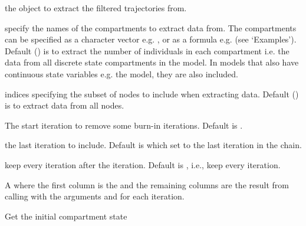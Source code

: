 \documentclass[letterpaper]{book}
\begin{document}
%
\begin{Arguments}
\begin{ldescription}
\item[\code{model}] the  object to extract the
filtered trajectories from.

\item[\code{compartments}] specify the names of the compartments to
extract data from. The compartments can be specified as a
character vector e.g. ,
or as a formula e.g.  (see
`Examples'). Default () is to
extract the number of individuals in each compartment i.e. the
data from all discrete state compartments in the model. In
models that also have continuous state variables e.g. the
 model, they are also included.

\item[\code{index}] indices specifying the subset of nodes to include
when extracting data. Default () is to
extract data from all nodes.

\item[\code{start}] The start iteration to remove some burn-in
iterations. Default is .

\item[\code{end}] the last iteration to include. Default is 
which set  to the last iteration in the chain.

\item[\code{thin}] keep every  iteration after the
 iteration. Default is , i.e., keep
every iteration.
\end{ldescription}
\end{Arguments}
%
\begin{Value}
A  where the first column is the
 and the remaining columns are the result from
calling  with the
arguments  and  for each
iteration.
\end{Value}
%
\begin{Description}
Get the initial compartment state
\end{Description}
\end{document}
